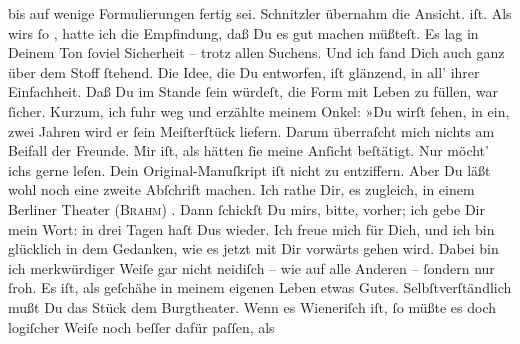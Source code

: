 \begin{ledgroupsized}[t]{13cm}
{{{                  bis auf wenige Formulierungen fertig sei. Schnitzler übernahm die Ansicht.}}}\label{K_L02616-1h} iſt. Als wirs ſo \label{K_L02616-2v}\label{K_L02616-2h}, hatte ich die Empfindung, daß Du es {\pb}gut machen müßteſt. Es lag in Deinem Ton ſoviel Sicherheit – trotz allen Suchens.
                  \strikeout{\textcolor{gray}{Un}} Und ich fand Dich auch ganz
               über dem Stoff ſtehend. Die Idee, die Du entworfen, iſt glänzend, in all’ ihrer
               Einfachheit. Daß Du im Stande ſein würdeſt, die Form mit Leben zu füllen, war ſicher.
               Kurzum, ich fuhr weg und erzählte meinem Onkel: »Du wirſt ſehen, in ein, zwei Jahren wird er ſein
               Meiſterſtück liefern. Darum überraſcht mich nichts am Beifall der Freunde. Mir iſt, als hätten ſie meine
               Anſicht beſtätigt. Nur möcht’ ichs gerne leſen. Dein Original-{\pb}Manuſkript iſt nicht zu entziffern. Aber Du läßt
               wohl noch eine zweite Abſchrift machen. Ich rathe Dir, es zugleich, in einem Berliner Theater (\textsc{Brahm}) \label{K_L02616-3v}\label{K_L02616-3h}. Dann ſchickſt Du mirs, bitte, vorher; ich gebe Dir mein Wort: in
               drei Tagen haſt Dus wieder. Ich freue mich für Dich, und ich bin glücklich in dem
               Gedanken, wie es jetzt mit Dir vorwärts gehen wird. Dabei bin ich merkwürdiger Weiſe
               gar nicht neidiſch – wie auf alle Anderen – ſondern nur ſroh. Es iſt, als geſchähe in
               meinem eigenen Leben etwas Gutes.\pend
           \pstart
           {\pb}Selbſtverſtändlich mußt Du das Stück dem Burgtheater\label{K_L02616-6v}\label{K_L02616-6h}. Wenn es Wieneriſch iſt, ſo müßte es doch logiſcher Weiſe noch beſſer dafür paſſen, als

\end{ledgroupsized}
